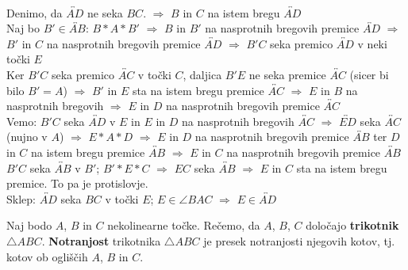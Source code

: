 \begin{dokaz}
            \\
            Denimo, da $\overleftrightarrow{AD}$  ne seka $BC$.
             $\Rightarrow$ $B$ in $C$ na istem bregu $\overleftrightarrow{AD}$
            \\ Naj bo $B' \in \overleftrightarrow{AB}$: $B\ast A\ast B'$ $\Rightarrow$ $B$ in $B'$ na nasprotnih bregovih premice $\overleftrightarrow{AD}$
            $\Rightarrow$ $B'$ in $C$ na nasprotnih bregovih premice $\overleftrightarrow{AD}$
            $\Rightarrow$ $B'C$ seka premico $\overleftrightarrow{AD}$ v neki točki $E$
            \\ Ker $B'C$ seka premico $\overleftrightarrow{AC}$ v točki $C$, daljica $B'E$ ne seka premice $\overleftrightarrow{AC}$ (sicer bi bilo $B'=A$)
            $\Rightarrow$ $B'$ in $E$ sta na istem bregu premice $\overleftrightarrow{AC}$
            $\Rightarrow$ $E$ in $B$ na nasprotnih bregovih
            $\Rightarrow$ $E$ in $D$ na nasprotnih bregovih premice $\overleftrightarrow{AC}$ 
            \\ Vemo: $B'C$ seka $\overleftrightarrow{AD}$ v $E$ in  $E$ in $D$ na nasprotnih bregovih $\overleftrightarrow{AC}$
            $\Rightarrow$ $\overleftrightarrow{ED}$ seka $\overleftrightarrow{AC}$ (nujno v $A$)
             $\Rightarrow$ $E\ast A\ast D$
             $\Rightarrow$ $E$ in $D$ na nasprotnih bregovih premice $\overleftrightarrow{AB}$ ter $D$ in $C$ na istem bregu premice  $\overleftrightarrow{AB}$
             $\Rightarrow$ $E$ in $C$ na nasprotnih bregovih premice $\overleftrightarrow{AB}$
            \\ $B'C$ seka $\overleftrightarrow{AB}$ v $B'$; $B'\ast E\ast C$ $\Rightarrow$ $EC$ seka $\overleftrightarrow{AB}$ 
             $\Rightarrow$ $E$ in $C$ sta na istem bregu premice. To pa je protislovje.
            \\ Sklep: $\overleftrightarrow{AD}$ seka $BC$ v točki $E$; $E \in \angle BAC$ $\Rightarrow$ $E \in \overleftrightarrow{AD}$
        \end{dokaz}

    \begin{definicija}
        Naj bodo $A$, $B$ in $C$ nekolinearne točke. 
        Rečemo, da $A$, $B$, $C$ določajo \textbf{trikotnik} $\triangle ABC$.
        \textbf{Notranjost} trikotnika $\triangle ABC$ je presek notranjosti njegovih kotov, tj. kotov ob ogliščih $A$, $B$ in $C$.
    \end{definicija}

